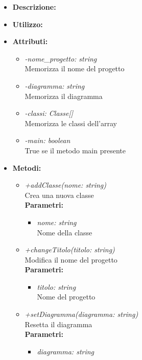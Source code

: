 \begin{itemize}
	\item \textbf{Descrizione:}\\
	
	\item \textbf{Utilizzo:}\\
	
	\item \textbf{Attributi:}
		\begin{itemize}
			\item \emph{-nome\_progetto: string}\\
			Memorizza il nome del progetto
			\item \emph{-diagramma: string}\\
			Memorizza il diagramma
			\item \emph{-classi: Classe[]}\\
			Memorizza le classi dell'array
			\item \emph{-main: boolean}\\
			True se il metodo main presente
		\end{itemize}
	\item \textbf{Metodi:}
		\begin{itemize}
			\item \emph{+addClasse(nome: string)}\\
    		Crea una nuova classe\\
    		\textbf{Parametri:}
    		\begin{itemize}
    			\item \emph{nome: string}\\
    			Nome della classe
    		\end{itemize}
    		\item \emph{+changeTitolo(titolo: string)}\\
    		Modifica il nome del progetto\\
    		\textbf{Parametri:}
    		\begin{itemize}
    			\item \emph{titolo: string}\\
    			Nome del progetto
    		\end{itemize}
    		\item \emph{+setDiagramma(diagramma: string)}\\
    		Resetta il diagramma\\
    		\textbf{Parametri:}
    		\begin{itemize}
    			\item \emph{diagramma: string}\\

\end{itemize}
\end{itemize}
\end{itemize}
